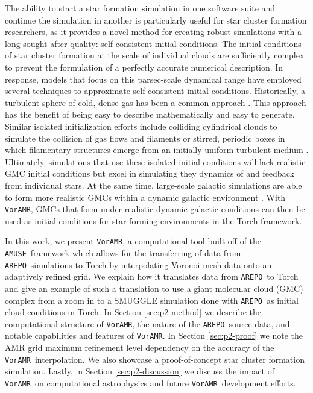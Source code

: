 \documentclass[twoside]{drexel-thesis}
\newcommand\voramr{\texttt{VorAMR}}
\newcommand\amuse{\texttt{AMUSE}}
\newcommand\arepo{\texttt{AREPO}}
\begin{document}
\begin{thesis}
The ability to start a star formation simulation in one software suite and continue the simulation in another is particularly useful for star cluster formation researchers, as it provides a novel method for creating robust simulations with a long sought after quality: self-consistent initial conditions. The initial conditions of star cluster formation at the scale of individual clouds are sufficiently complex to prevent the formulation of a perfectly accurate numerical description. In response, models that focus on this parsec-scale dynamical range have employed several techniques to approximate self-consistent initial conditions. Historically,  a turbulent sphere of cold, dense gas has been a common approach \citep[e.g.][]{bate_modelling_1995, bate_formation_2002, dale_ionizing_2012, dale_before_2014, wall_collisional_2019, wall_modeling_2020}. This approach has the benefit of being easy to describe mathematically and easy to generate. Similar isolated initialization efforts include colliding cylindrical clouds to simulate the collision of gas flows and filaments \citep[e.g.][]{vazquez-semadeni_hierarchical_2017,dobbs_formation_2020,dobbs_formation_2022} or stirred, periodic boxes in which filamentary structures emerge from an initially uniform turbulent medium \citep[e.g.][]{tilley_formation_2004,krumholz_radiation_2011}. Ultimately, simulations that use these isolated initial conditions will lack realistic GMC initial conditions but excel in simulating they dynamics of and feedback from individual stars. At the same time, large-scale galactic simulations are able to form more realistic GMCs within a dynamic galactic environment \citep{jeffreson_scale_2022,he_molecular_2023}. With \voramr, GMCs that form under realistic dynamic galactic conditions can then be used as initial conditions for star-forming environments in the Torch framework.

In this work, we present \voramr, a computational tool built off of the \amuse~framework which allows for the transferring of data from \arepo~simulations to Torch by interpolating Voronoi mesh data onto an adaptively refined grid. We explain how it translates data
from \arepo~to Torch and give an example of such a translation to use a giant molecular cloud (GMC) complex from a zoom in to a SMUGGLE simulation \citep{li_effects_2020} done with \arepo\ as initial cloud conditions in Torch. In Section \ref{sec:p2-method} we describe the computational structure of \voramr, the nature of the \arepo~source data, and notable capabilities and features of \voramr. In Section \ref{sec:p2-proof} we note the AMR grid maximum refinement level dependency on the accuracy of the \voramr~interpolation. We also showcase a proof-of-concept star cluster formation simulation. Lastly, in Section \ref{sec:p2-discussion} we discuss the impact of \voramr~on computational astrophysics and future \voramr~development efforts.


\end{thesis}
\end{document}
